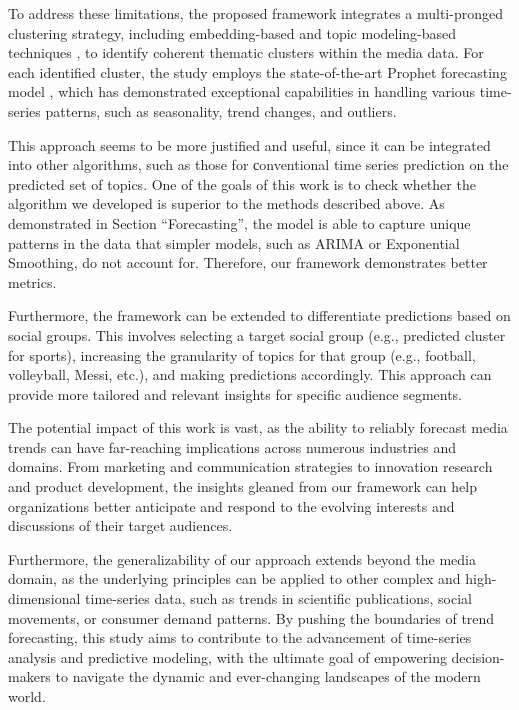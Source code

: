 
To address these limitations, the proposed framework integrates a multi-pronged clustering strategy, including embedding-based \cite{sinaga2020unsupervised} and topic modeling-based techniques \cite{blei2003latent}, to identify coherent thematic clusters within the media data. For each identified cluster, the study employs the state-of-the-art Prophet forecasting model \cite{Taylor2018}, which has demonstrated exceptional capabilities in handling various time-series patterns, such as seasonality, trend changes, and outliers. 



This approach seems to be more justified and useful, since it can be integrated into other algorithms, such as those for сonventional time series prediction on the predicted set of topics. One of the goals of this work is to check whether the algorithm we developed is superior to the methods described above. As demonstrated in Section “Forecasting”, the model is able to capture unique patterns in the data that simpler models, such as ARIMA or Exponential Smoothing, do not account for. Therefore, our framework demonstrates better metrics.

Furthermore, the framework can be extended to differentiate predictions based on social groups. This involves selecting a target social group (e.g., predicted cluster for sports), increasing the granularity of topics for that group (e.g., football, volleyball, Messi, etc.), and making predictions accordingly. This approach can provide more tailored and relevant insights for specific audience segments.

The potential impact of this work is vast, as the ability to reliably forecast media trends can have far-reaching implications across numerous industries and domains. From marketing and communication strategies to innovation research and product development, the insights gleaned from our framework can help organizations better anticipate and respond to the evolving interests and discussions of their target audiences.

Furthermore, the generalizability of our approach extends beyond the media domain, as the underlying principles can be applied to other complex and high-dimensional time-series data, such as trends in scientific publications, social movements, or consumer demand patterns. By pushing the boundaries of trend forecasting, this study aims to contribute to the advancement of time-series analysis and predictive modeling, with the ultimate goal of empowering decision-makers to navigate the dynamic and ever-changing landscapes of the modern world.






